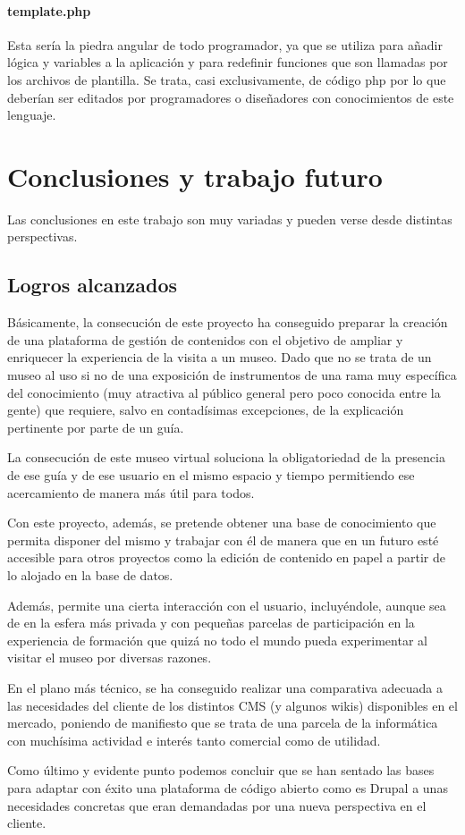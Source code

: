 \paragraph{template.php}
\par Esta sería la piedra angular de todo programador, ya que se utiliza para añadir lógica y variables a la aplicación y para redefinir funciones que son llamadas por los archivos de plantilla. Se trata, casi exclusivamente, de código php por lo que deberían ser editados por programadores o diseñadores con conocimientos de este lenguaje.




\section{Conclusiones y trabajo futuro}
\par Las conclusiones en este trabajo son muy variadas y pueden verse desde distintas perspectivas. 

\subsection{Logros alcanzados}
\par Básicamente, la consecución de este proyecto ha conseguido preparar la creación de una plataforma de gestión de contenidos con el objetivo de ampliar y enriquecer la experiencia de la visita a un museo. Dado que no se trata de un museo al uso si no de una exposición de instrumentos de una rama muy específica del conocimiento (muy atractiva al público general pero poco conocida entre la gente) que requiere, salvo en contadísimas excepciones, de la explicación pertinente por parte de un guía.
\par La consecución de este museo virtual soluciona la obligatoriedad de la presencia de ese guía y de ese usuario en el mismo espacio y tiempo permitiendo ese acercamiento de manera más útil para todos.
\par Con este proyecto, además, se pretende obtener una base de conocimiento que permita disponer del mismo y trabajar con él de manera que en un futuro esté accesible para otros proyectos como la edición de contenido en papel a partir de lo alojado en la base de datos.
\par Además, permite una cierta interacción con el usuario, incluyéndole, aunque sea de en la esfera más privada y con pequeñas parcelas de participación en la experiencia de formación que quizá no todo el mundo pueda experimentar al visitar el museo por diversas razones.
\par En el plano más técnico, se ha conseguido realizar una comparativa adecuada a las necesidades del cliente de los distintos CMS (y algunos wikis) disponibles en el mercado, poniendo de manifiesto que se trata de una parcela de la informática con muchísima actividad e interés tanto comercial como de utilidad.
\par Como último y evidente punto podemos concluir que se han sentado las bases para adaptar con éxito una plataforma de código abierto como es Drupal a unas necesidades concretas que eran demandadas por una nueva perspectiva en el cliente.

